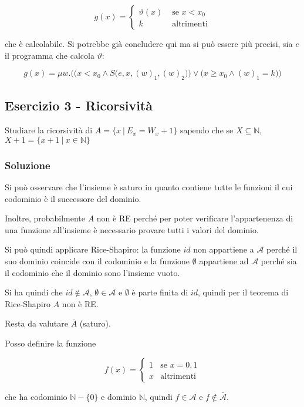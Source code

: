 $$
g(x) = \begin{cases}
\vartheta(x) &\text{ se } x < x_0 \\
k &\text{ altrimenti}
\end{cases}
$$

che è calcolabile.
Si potrebbe già concludere qui ma si può essere più precisi, sia $e$ il programma che calcola $\vartheta$:

$$
g(x) = \mu w. \Bigg(  \bigg( x < x_0 \wedge S\Big( e,x,(w)_1, (w)_2\Big) \bigg)   \vee \Big(   x \geq x_0 \wedge (w)_1 = k  \Big)   \Bigg)
$$

\subsection{Esercizio 3 - Ricorsività}

Studiare la ricorsività di $A = \{ x \: | \: E_x = W_x +1  \}$ sapendo che se  $X \subseteq \mathbb{N}$, $X +1 = \{ x+1 \: | \: x \in \mathbb{N}\}$

\subsubsection{Soluzione}

Si può osservare che l'insieme è saturo in quanto contiene tutte le funzioni il cui codominio è il successore del dominio.

Inoltre, probabilmente $A$ non è RE perché per poter verificare l'appartenenza di una funzione all'insieme è necessario provare tutti i valori del dominio.

Si può quindi applicare Rice-Shapiro: la funzione $id$ non appartiene a $\mathcal{A}$ perché il suo dominio coincide con il codominio e la funzione $\emptyset$ appartiene ad $\mathcal{A}$ perché sia il codominio che il dominio sono l'insieme vuoto.

Si ha quindi che $id \notin \mathcal{A}$, $\emptyset \in \mathcal{A}$ e $\emptyset$ è parte finita di $id$, quindi per il teorema di Rice-Shapiro $A$ non è RE.

Resta da valutare $\overline{A}$ (saturo).

Posso definire la funzione 

$$
f(x) = \begin{cases}
1 &\text{se } x= 0,1 \\
x &\text{altrimenti}
\end{cases}
$$

che ha codominio $\mathbb{N} - \{ 0 \}$ e dominio $\mathbb{N}$, quindi $f \in \mathcal{A}$ e $f \notin \overline{\mathcal{A}}$.

